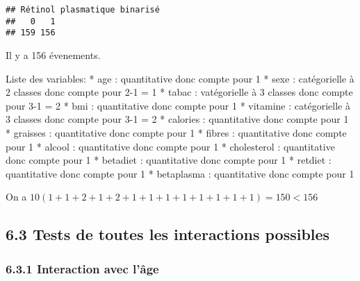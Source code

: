 \documentclass[]{article}
\newenvironment{Shaded}{\begin{snugshade}}{\end{snugshade}}
\newcommand{\KeywordTok}[1]{\textcolor[rgb]{0.13,0.29,0.53}{\textbf{#1}}}
\newcommand{\DataTypeTok}[1]{\textcolor[rgb]{0.13,0.29,0.53}{#1}}
\newcommand{\DecValTok}[1]{\textcolor[rgb]{0.00,0.00,0.81}{#1}}
\newcommand{\StringTok}[1]{\textcolor[rgb]{0.31,0.60,0.02}{#1}}
\newcommand{\OperatorTok}[1]{\textcolor[rgb]{0.81,0.36,0.00}{\textbf{#1}}}
\newcommand{\NormalTok}[1]{#1}
\begin{document}
\begin{verbatim}
## Rétinol plasmatique binarisé
##   0   1 
## 159 156
\end{verbatim}

Il y a 156 évenements.

Liste des variables: * age : quantitative donc compte pour 1 * sexe :
catégorielle à 2 classes donc compte pour 2-1 = 1 * tabac : vatégorielle
à 3 classes donc compte pour 3-1 = 2 * bmi : quantitative donc compte
pour 1 * vitamine : catégorielle à 3 classes donc compte pour 3-1 = 2 *
calories : quantitative donc compte pour 1 * graisses : quantitative
donc compte pour 1 * fibres : quantitative donc compte pour 1 * alcool :
quantitative donc compte pour 1 * cholesterol : quantitative donc compte
pour 1 * betadiet : quantitative donc compte pour 1 * retdiet :
quantitative donc compte pour 1 * betaplasma : quantitative donc compte
pour 1

On a \(10(1+1+2+1+2+1+1+1+1+1+1+1+1) = 150 < 156\)

\subsection{6.3 Tests de toutes les interactions
possibles}\label{tests-de-toutes-les-interactions-possibles-1}

\subsubsection{6.3.1 Interaction avec
l'âge}\label{interaction-avec-luxe2ge-1}

\begin{Shaded}
\end{Shaded}
\end{document}
